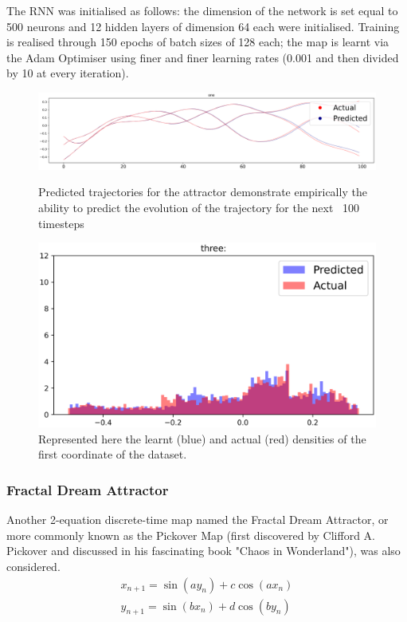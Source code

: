 \documentclass[a4paper,12pt,twoside]{report}
\begin{document}
The RNN was initialised as follows: the dimension of the network is set equal to 500 neurons and 12 hidden layers of dimension 64 each were initialised. Training is realised through 150 epochs of batch sizes of 128 each; the map is learnt via the Adam Optimiser using finer and finer learning rates (0.001 and then divided by 10 at every iteration).

\begin{figure}[ht]
  \centering
  \includegraphics[scale=0.35]{_Thomas_1.eps}\caption*{Predicted trajectories for the attractor demonstrate empirically the ability to predict the evolution of the trajectory for the next ~100 timesteps}
  \includegraphics[scale=0.5]{_Thomas_3.eps}\caption*{Represented here the learnt (blue) and actual (red) densities of the first coordinate of the dataset.}
\end{figure}


\subsubsection{Fractal Dream Attractor}

Another 2-equation discrete-time map named the Fractal Dream Attractor, or more commonly known as the Pickover Map (first discovered by Clifford A. Pickover and discussed in his fascinating book "Chaos in Wonderland"\cite{PickoverChaos}), was also considered.
\begin{eqnarray}\label{eqns_clifford}
  {x_{n+1}=\sin(ay_n) + c\cos(ax_n)} \\
  {y_{n+1}=\sin(bx_n)+d\cos(by_n)}
\end{eqnarray}
\end{document}
